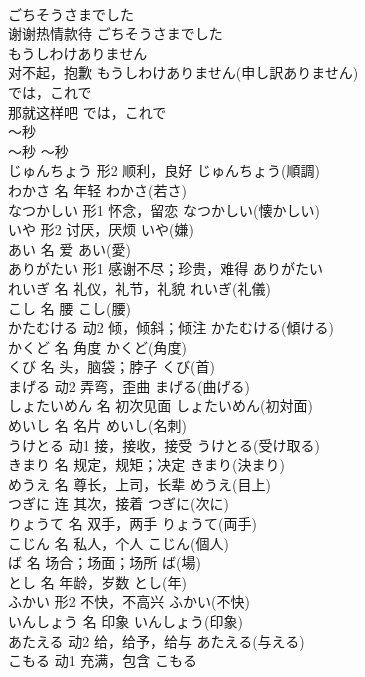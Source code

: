 \documentclass[8pt]{extreport}
\begin{document}
\begin{CJK}{UTF8}{min}
\\	ごちそうさまでした	
\\	谢谢热情款待	ごちそうさまでした	
\\	もうしわけありません	
\\	对不起，抱歉	もうしわけありません(申し訳ありません)	
\\	では，これで	
\\	那就这样吧	では，これで	
\\	～秒	
\\	～秒	～秒	
\\	じゅんちょう	形2	顺利，良好	じゅんちょう(順調)	
\\	わかさ	名	年轻	わかさ(若さ)	
\\	なつかしい	形1	怀念，留恋	なつかしい(懐かしい)	
\\	いや	形2	讨厌，厌烦	いや(嫌)	
\\	あい	名	爱	あい(愛)	
\\	ありがたい	形1	感谢不尽；珍贵，难得	ありがたい	
\\	れいぎ	名	礼仪，礼节，礼貌	れいぎ(礼儀)	
\\	こし	名	腰	こし(腰)	
\\	かたむける	动2	倾，倾斜；倾注	かたむける(傾ける)	
\\	かくど	名	角度	かくど(角度)	
\\	くび	名	头，脑袋；脖子	くび(首)	
\\	まげる	动2	弄弯，歪曲	まげる(曲げる)	
\\	しょたいめん	名	初次见面	しょたいめん(初対面)	
\\	めいし	名	名片	めいし(名刺)	
\\	うけとる	动1	接，接收，接受	うけとる(受け取る)	
\\	きまり	名	规定，规矩；决定	きまり(決まり)	
\\	めうえ	名	尊长，上司，长辈	めうえ(目上)	
\\	つぎに	连	其次，接着	つぎに(次に)	
\\	りょうて	名	双手，两手	りょうて(両手)	
\\	こじん	名	私人，个人	こじん(個人)	
\\	ば	名	场合；场面；场所	ば(場)	
\\	とし	名	年龄，岁数	とし(年)	
\\	ふかい	形2	不快，不高兴	ふかい(不快)	
\\	いんしょう	名	印象	いんしょう(印象)	
\\	あたえる	动2	给，给予，给与	あたえる(与える)	
\\	こもる	动1	充满，包含	こもる	

\end{CJK}
\end{document}
